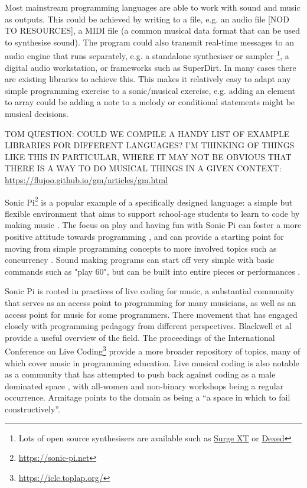 Most mainstream programming languages are able to work with sound and music as outputs. This could be achieved by writing to a file, e.g. an audio file [NOD TO RESOURCES], a MIDI file (a common musical data format that can be used to synthesise sound). The program could also transmit real-time messages to an audio engine that runs separately, e.g. a standalone synthesiser or sampler \footnote{Lots of open source synthesisers are available such as \href{https://surge-synthesizer.github.io/}{Surge XT} or \href{https://asb2m10.github.io/dexed/}{Dexed}}, a digital audio workstation, or frameworks such as SuperDirt. In many cases there are existing libraries to achieve this. This makes it relatively easy to adapt any simple programming exercise to a sonic/musical exercise, e.g. adding an element to array could be adding a note to a melody or conditional statements might be musical decisions.

TOM QUESTION: COULD WE COMPILE A HANDY LIST OF EXAMPLE LIBRARIES FOR DIFFERENT LANGUAGES? I'M THINKING OF THINGS LIKE THIS IN PARTICULAR, WHERE IT MAY NOT BE OBVIOUS THAT THERE IS A WAY TO DO MUSICAL THINGS IN A GIVEN CONTEXT:
\href{https://flujoo.github.io/gm/articles/gm.html}{https://flujoo.github.io/gm/articles/gm.html}


Sonic Pi\footnote{\url{https://sonic-pi.net}} is a popular example of a specifically designed language: a simple but flexible environment that aims to support school-age students to learn to code by making music \cite{aaron_sonic_2016}. The focus on play and having fun with Sonic Pi can foster a more positive attitude towards programming \cite{petri_sonicpi_2022}, and can provide a starting point for moving from simple programming concepts to more involved topics such as concurrency \cite{traversaro_hearplay_2024}. Sound making programs can start off very simple with basic commands such as "play 60", but can be built into entire pieces or performances \cite{}. 

Sonic Pi is rooted in practices of live coding for music, a substantial community that serves as an access point to programming for many musicians, as well as an access point for music for some programmers. There  movement that has engaged closely with programming pedagogy from different perspectives. Blackwell et al \cite{blackwell_livecoding_2022} provide a useful overview of the field. The proceedings of the International Conference on Live Coding\footnote{\url{https://iclc.toplap.org/}} provide a more broader repository of topics, many of which cover music in programming education. Live musical coding is also notable as a community that has attempted to push back against coding as a male dominated space \cite{blackwell_livecoding_2022}, with all-women and non-binary workshops being a regular occurrence. Armitage \cite{armitage_spaces_2018} points to the domain as being a ``a space in which to fail constructively''.

